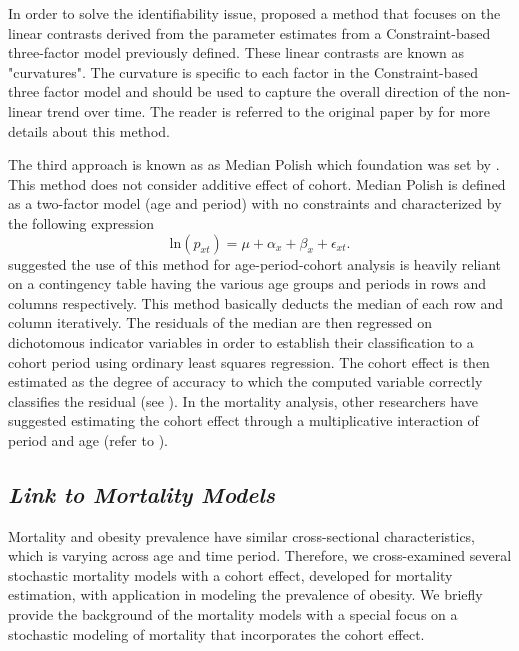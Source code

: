 \documentclass[11pt,letterpaper]{article}
\numberwithin{equation}{section}
\begin{document}
In order to solve the identifiability issue, \cite{Holford:1991} proposed a method that focuses on the linear contrasts
derived from the parameter estimates from a Constraint-based three-factor model previously defined. These linear contrasts are known as "curvatures". The curvature is specific to each factor in the Constraint-based three factor model and should be used to capture the overall direction of the non-linear trend over time. The reader is referred to the original paper by \cite{Holford:1991} for more details about this method.

The third approach is known as as Median Polish which foundation was set by \cite{Tukey:1977}. This method does not consider additive effect of cohort. Median Polish is defined as a two-factor model (age and period) with no constraints and characterized by the following expression
\begin{equation}
\label{eq:p1a}
\text{ln}(p_{xt})=\mu + \alpha_{x} + \beta_{x} + \epsilon_{xt}.
\end{equation}
\cite{Selvin:2004} suggested the use of this method for age-period-cohort analysis is heavily reliant on a contingency table having the various age groups and periods in rows and columns respectively. This method basically deducts the median of each row and column iteratively. The residuals of the median are then regressed on dichotomous indicator variables in order to establish their classification to a cohort period using ordinary least squares regression. The cohort effect is then estimated as the degree of accuracy to which the computed variable correctly classifies the residual (see \cite{Keyes+Utz+Robinson+Li:2010}). In the mortality analysis, other researchers have suggested estimating the cohort effect through a multiplicative interaction of period and age (refer to \cite{Keyes+Utz+Robinson+Li:2010}).

\subsection{\textit{Link to Mortality Models}}
Mortality and obesity prevalence have similar cross-sectional characteristics, which is varying across age and time period. Therefore, we cross-examined several stochastic mortality models with a cohort effect, developed for mortality estimation, with application in modeling the prevalence of obesity. We briefly provide the background of the mortality models with a special focus on a stochastic modeling of mortality that incorporates the cohort effect.
\end{document}
